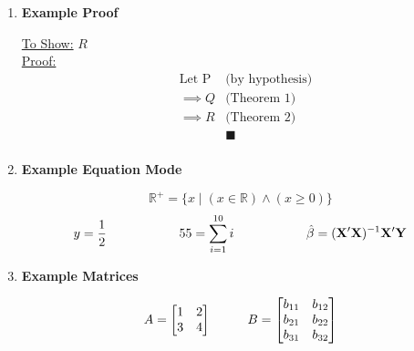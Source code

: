 \documentclass{article}
\begin{document}
\begin{enumerate}
	\vspace{10pt}



\item\textbf{Example Proof}

	\underline{To Show:} $R$ \\
	\underline{Proof:} 
	\begin{align*}
		& \text{Let P} & \text{(by hypothesis)} \\
		& \implies Q & \text{(Theorem 1)} \\
		& \implies R & \text{(Theorem 2)} \\
		&& \blacksquare \\
	\end{align*}

	\vspace{10pt}


\item\textbf{Example Equation Mode}

	\[ \mathbb{R}^+ = \{ x \mid ( x \in \mathbb{R} ) \wedge (x \geq 0)  \} \]
	\[ y = \frac{1}{2} \hspace{20mm} 55 = \sum_{i = 1}^{10} i \hspace{10mm} \hspace{10mm} \hat{\beta} = (\mathbf{X'X})^{-1} \mathbf{X'Y} \]  %
	
	\vspace{10pt}



\item\textbf{Example Matrices}


	\[
	A=\begin{bmatrix} 1 & 2 \\ 3 & 4\end{bmatrix} 	
	\hspace{10mm}  
	B=\begin{bmatrix} b_{11} & b_{12} \\ b_{21} & b_{22} \\ b_{31} &  b_{32} \end{bmatrix} 	
	\]


\end{enumerate}
\end{document}
